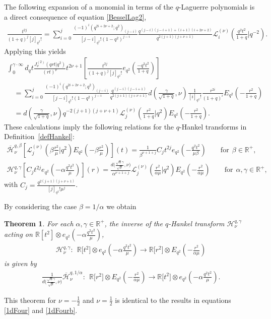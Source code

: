\documentclass[11pt]{article}
\newtheorem{theorem}{Theorem}
\newcommand{\mR}{\mathbb{R}}
\newcommand{\cH}{\mathcal{H}}
\newcommand{\cL}{\mathcal{L}}
\numberwithin{equation}{section}
\begin{document}
The following expansion of a monomial in terms of the $q$-Laguerre polynomials is a direct consequence of equation \eqref{BesselLag2},
\begin{gather*}
\frac{t^{2j}}{(1+q)^j[j]_{q^2}!}=\sum_{i=0}^j\frac{(-1)^i(q^{2i+2\nu+2};q^2)_{(j-i)}}{[j-i]_{q^2}!(1-q^2)^{j-i}}
\frac{q^{(j-i)(j-i+1)+(i+1)(i+2\nu+2)}}{q^{2(j+1)(j+\nu+1)}}\cL_i^{(\nu)}\left(\frac{q^2t^2}{1+q}|q^{-2}\right).
\end{gather*}
Applying this yields
\begin{gather*}
\int_0^{\gamma\cdot\infty}d_qt\frac{J_\nu^{(2)}(qrt|q^2)}{(rt)^{\nu}}t^{2\nu+1}
\left[\frac{t^{2j}}{(1+q)^j[j]_{q^2}!}e_{q^2}\left(\frac{-q^2t^2}{1+q}\right)\right]\\
\quad{}=\sum_{i=0}^j\frac{(-1)^i(q^{2i+2\nu+2};q^2)_{(j-i)}}{[j-i]_{q^2}!(1-q^2)^{j-i}}\frac{q^{(j-i)(j-i+1)}}{q^{2(j+1)(j+\nu+1)}}
d\left(\frac{\gamma}{\sqrt{1+q}},\nu\right)\frac{1}{[i]_{q^2}!}\frac{r^{2i}}{(1+q)^i}E_{q^2}\left(-\frac{r^2}{1+q}\right)\\
\quad{}=d\left(\frac{\gamma}{\sqrt{1+q}},\nu\right) q^{-2(j+1)(j+\nu+1)}\cL^{(\nu)}_j\left(\frac{r^2}{1+q}|q^2\right)E_{q^2}\left(-\frac{r^2}{1+q}\right).
\end{gather*}
These calculations imply the following relations for the $q$-Hankel transforms in Def\/inition~\ref{defHankel}:
\begin{gather*}
\overline{\cH}_{\nu}^{q,\beta}\left[\cL_j^{(\nu)}\left(\beta\frac{r^2}{\mu}|q^2\right)E_{q^2}\left(-\beta\frac{r^2}{\mu}\right)\right](t)=
\frac{1}{\beta^{\nu+1+j}}C_jt^{2j}e_{q^2}\left(-\frac{q^2t^2}{\mu\beta}\right)\qquad\mbox{for} \ \ \beta\in\mR^+,\\
\cH^{q,\gamma}_{\nu}\left[C_jt^{2j}e_{q^2}\left(-\alpha\frac{q^2t^2}{\mu}\right)\right](r)= \frac{d\big(\frac{\sqrt{\alpha}\gamma}{\sqrt{\mu}},\nu\big) }{\alpha^{\nu+1+j}}\cL^{(\nu)}_j\left(\frac{r^2}{\alpha\mu}|q^2\right)E_{q^2}\left(-\frac{r^2}{\alpha\mu}\right)\!\qquad\mbox{for} \ \ \alpha,\gamma\in\mR^+,
\end{gather*}
with $C_j=\frac{q^{2(j+1)(j+\nu+1)}}{[j]_{q^2}!\mu^j}$.


By considering the case $\beta=1/\alpha$ we obtain
\begin{theorem}
\label{Hankelinv}
For each $\alpha,\gamma\in\mR^+$, the inverse of the $q$-Hankel transform $\cH_\nu^{q,\gamma}$ acting on $\mR[t^2]\otimes e_{q^2}(-\alpha\frac{q^2t^2}{\mu})$,
\begin{gather*}
\cH_\nu^{q,\gamma}: \ \ \mR\big[t^2\big]\otimes e_{q^2}\left(-\alpha\frac{q^2t^2}{\mu}\right) \to\mR\big[r^2\big]\otimes E_{q^2}\left(-\frac{r^2}{\alpha\mu}\right)
\end{gather*}
is given by
\begin{gather*}
\frac{1}{d\big(\frac{\sqrt\alpha \gamma}{\sqrt\mu},\nu\big)}\overline{\cH}^{q,1/\alpha}_{\nu}: \ \ \mR\big[r^2\big]\otimes E_{q^2}\left(-\frac{r^2}{\alpha\mu}\right)\to \mR\big[t^2\big]\otimes e_{q^2}\left(-\alpha\frac{q^2t^2}{\mu}\right).
\end{gather*}
\end{theorem}
This theorem for $\nu=-\frac{1}{2}$ and $\nu=\frac{1}{2}$ is identical to the results in equations \eqref{1dFour} and \eqref{1dFourb}.
\end{document}
